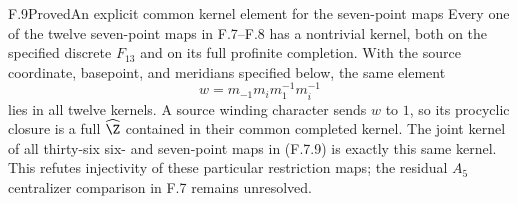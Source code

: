 \begin{claim}{F.9}{Proved}{An explicit common kernel element for the seven-point maps}
Every one of the twelve seven-point maps in F.7--F.8 has
a nontrivial kernel, both on the specified discrete
$F_{13}$ and on its full profinite completion.  With the
source coordinate, basepoint, and meridians specified
below, the same element
\[
 w=m_{-1}m_i m_1^{-1}m_i^{-1}                         \tag{F.9.1}
\]
lies in all twelve kernels.  A source winding character
sends $w$ to $1$, so its procyclic closure is a full
$\widehat\Z$ contained in their common completed kernel.
The joint kernel of all thirty-six six- and seven-point
maps in (F.7.9) is exactly this same kernel.
This refutes injectivity of these particular restriction
maps; the residual $A_5$ centralizer comparison in F.7
remains unresolved.
\end{claim}
